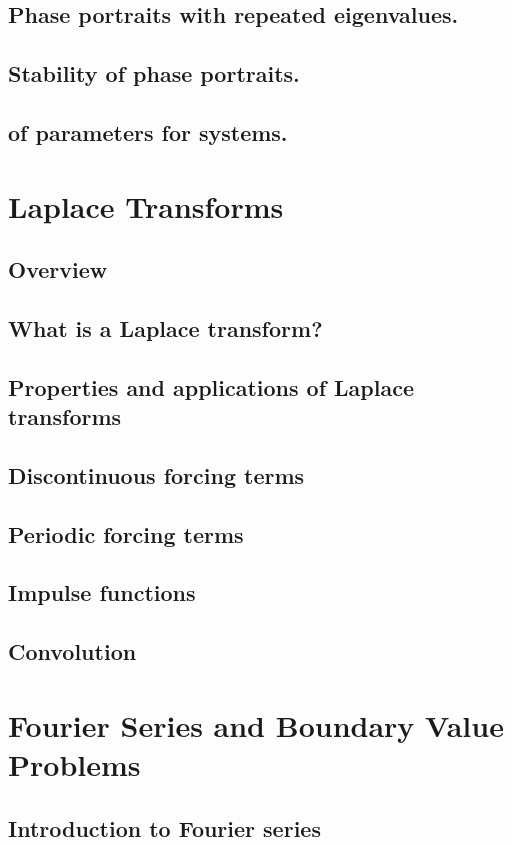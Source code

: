 \documentclass{article}
\begin{document}
\subsection{Phase portraits with repeated eigenvalues.}
\subsection{Stability of phase portraits.}
\subsection{of parameters for systems.}

\pagebreak
\section{Laplace Transforms}
\subsection*{Overview}

\subsection{What is a Laplace transform?}
\subsection{Properties and applications of Laplace transforms}
\subsection{Discontinuous forcing terms}
\subsection{Periodic forcing terms}
\subsection{Impulse functions}
\subsection{Convolution}

\pagebreak
\section{Fourier Series and Boundary Value Problems}

\subsection{Introduction to Fourier series}
\end{document}
